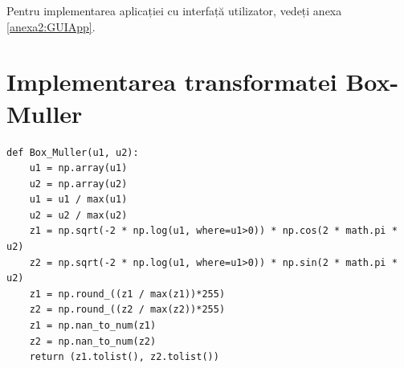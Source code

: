 Pentru implementarea aplicației cu interfață utilizator, vedeți anexa \ref{anexa2:GUIApp}.

\section{Implementarea transformatei Box-Muller}
\begin{code}
\begin{verbatim}
def Box_Muller(u1, u2):
    u1 = np.array(u1)
    u2 = np.array(u2)
    u1 = u1 / max(u1)
    u2 = u2 / max(u2)
    z1 = np.sqrt(-2 * np.log(u1, where=u1>0)) * np.cos(2 * math.pi * u2)
    z2 = np.sqrt(-2 * np.log(u1, where=u1>0)) * np.sin(2 * math.pi * u2)
    z1 = np.round_((z1 / max(z1))*255)
    z2 = np.round_((z2 / max(z2))*255)
    z1 = np.nan_to_num(z1)
    z2 = np.nan_to_num(z2)
    return (z1.tolist(), z2.tolist())
\end{verbatim}
\end{code}
